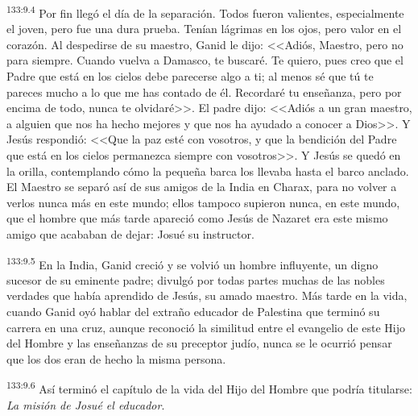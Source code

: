 \par 
\textsuperscript{133:9.4} Por fin llegó el día de la separación. Todos fueron valientes, especialmente el joven, pero fue una dura prueba. Tenían lágrimas en los ojos, pero valor en el corazón. Al despedirse de su maestro, Ganid le dijo: <<Adiós, Maestro, pero no para siempre. Cuando vuelva a Damasco, te buscaré. Te quiero, pues creo que el Padre que está en los cielos debe parecerse algo a ti; al menos sé que tú te pareces mucho a lo que me has contado de él. Recordaré tu enseñanza, pero por encima de todo, nunca te olvidaré>>. El padre dijo: <<Adiós a un gran maestro, a alguien que nos ha hecho mejores y que nos ha ayudado a conocer a Dios>>. Y Jesús respondió: <<Que la paz esté con vosotros, y que la bendición del Padre que está en los cielos permanezca siempre con vosotros>>. Y Jesús se quedó en la orilla, contemplando cómo la pequeña barca los llevaba hasta el barco anclado. El Maestro se separó así de sus amigos de la India en Charax, para no volver a verlos nunca más en este mundo; ellos tampoco supieron nunca, en este mundo, que el hombre que más tarde apareció como Jesús de Nazaret era este mismo amigo que acababan de dejar: Josué su instructor.

\par 
\textsuperscript{133:9.5} En la India, Ganid creció y se volvió un hombre influyente, un digno sucesor de su eminente padre; divulgó por todas partes muchas de las nobles verdades que había aprendido de Jesús, su amado maestro. Más tarde en la vida, cuando Ganid oyó hablar del extraño educador de Palestina que terminó su carrera en una cruz, aunque reconoció la similitud entre el evangelio de este Hijo del Hombre y las enseñanzas de su preceptor judío, nunca se le ocurrió pensar que los dos eran de hecho la misma persona.

\par 
\textsuperscript{133:9.6} Así terminó el capítulo de la vida del Hijo del Hombre que podría titularse: \textit{La misión de Josué el educador}.